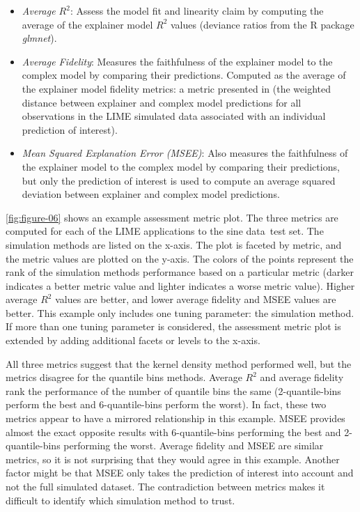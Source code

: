 \documentclass[AMS,STIX2COL]{WileyNJD-v2}\usepackage[]{graphicx}\usepackage[]{color}
\newcommand{\data}{sine data}
\begin{document}
\begin{itemize}
\item \emph{Average $R^2$}: Assess the model fit and linearity claim by computing the average of the explainer model $R^2$ values (deviance ratios from the R package \emph{glmnet}).

\item \emph{Average Fidelity}: Measures the faithfulness of the explainer model to the complex model by comparing their predictions. Computed as the average of the explainer model fidelity metrics: a metric presented in \citet{ribeiro:2016} (the weighted distance between explainer and complex model predictions for all observations in the LIME simulated data associated with an individual prediction of interest). 

\item \emph{Mean Squared Explanation Error (MSEE)}: Also measures the faithfulness of the explainer model to the complex model by comparing their predictions, but only the prediction of interest is used to compute an average squared deviation between explainer and complex model predictions.
\end{itemize}

\autoref{fig:figure-06} shows an example assessment metric plot. The three metrics are computed for each of the LIME applications to the \data \ test set. The simulation methods are listed on the x-axis. The plot is faceted by metric, and the metric values are plotted on the y-axis. The colors of the points represent the rank of the simulation methods performance based on a particular metric (darker indicates a better metric value and lighter indicates a worse metric value). Higher average $R^2$ values are better, and lower average fidelity and MSEE values are better. This example only includes one tuning parameter: the simulation method. If more than one tuning parameter is considered, the assessment metric plot is extended by adding additional facets or levels to the x-axis.

All three metrics suggest that the kernel density method performed well, but the metrics disagree for the quantile bins methods. Average $R^2$ and average fidelity rank the performance of the number of quantile bins the same (2-quantile-bins perform the best and 6-quantile-bins perform the worst). In fact, these two metrics appear to have a mirrored  relationship in this example. MSEE provides almost the exact opposite results with  6-quantile-bins performing the best and 2-quantile-bins performing the worst. Average fidelity and MSEE are similar metrics, so it is not surprising that they would agree in this example. Another factor might be that MSEE only takes the prediction of interest  into account and not the full simulated dataset. The contradiction between metrics makes it difficult to identify which simulation method to trust. 
\end{document}
